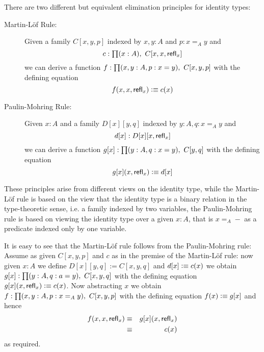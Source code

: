 There are two different but equivalent elimination principles for
identity types:
\begin{description}
\item[Martin-L\"{o}f Rule:] 
Given a family $C[x,y,p]$ indexed by $x,y:A$ and $p:x=_A y$ and 
\[c:\prd{x:A} C[x,x,\refl{x}]\]
we can derive a function $f:\prd{x,y:A,p:x = y}C[x,y,p]$ with the
defining equation 
\[ f(x,x,\mathsf{refl}_{x}) \vcentcolon\equiv c(x) \]
\item[Paulin-Mohring Rule:] 
Given $x:A$ and a family $D[x][y,q]$ indexed by $y:A,q:x=_A y$ and 
\[ d[x]:D[x][x,\mathsf{refl}_{x}] \]
we can derive a function $g[x]:\prd{y:A,q:x = y}C[y,q]$ with the defining
equation 
\[ g[x](x,\mathsf{refl}_{x}) \vcentcolon\equiv d[x] \]
\end{description}
These principles arise from different views on the identity type,
while the Martin-L\"of rule is based on the view that the identity
type is a binary relation in the type-theoretic sense, i.e. a family
indexed by two variables, the Paulin-Mohring rule is based on viewing
the identity type over a given $x:A$, that is $x =_A -$ as a predicate
indexed only by one variable.

It is easy to see that the Martin-L\"of rule follows from the
Paulin-Mohring rule: Assume as given $C[x,y,p]$ and $c$ as in the
premise of the Martin-L\"of rule: now given $x:A$ we define $D[x][y,q] :=
C[x,y,q]$ and $d[x] \vcentcolon\equiv c(x)$ we obtain $g[x]:\prd{y:A,q:a = y}C[x,y,q]$
with the defining equation $g[x](x,\mathsf{refl}_{x}) \vcentcolon\equiv c(x)$. Now
abstracting $x$ we obtain $f : \prd{x,y:A,p:x =_A y}C[x,y,p]$ with the
defining equation $f(x) \vcentcolon\equiv g[x]$ and hence 
\begin{eqnarray*}
f(x,x,\mathsf{refl}_{x}) & \equiv & g[x](x,\mathsf{refl}_{x})  \\
                   & \equiv & c(x)
\end{eqnarray*}
as required.

